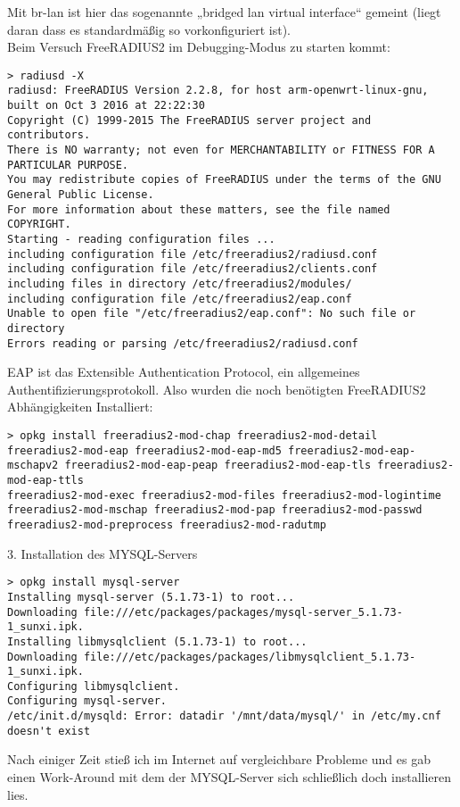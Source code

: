 Mit br-lan ist hier das sogenannte „bridged lan virtual interface“ gemeint (liegt daran dass es
standardmäßig so vorkonfiguriert ist).\\
Beim Versuch FreeRADIUS2 im Debugging-Modus zu starten kommt:\
\begin{lstlisting}
> radiusd -X
radiusd: FreeRADIUS Version 2.2.8, for host arm-openwrt-linux-gnu, built on Oct 3 2016 at 22:22:30
Copyright (C) 1999-2015 The FreeRADIUS server project and contributors.
There is NO warranty; not even for MERCHANTABILITY or FITNESS FOR A PARTICULAR PURPOSE.
You may redistribute copies of FreeRADIUS under the terms of the GNU General Public License.
For more information about these matters, see the file named COPYRIGHT.
Starting - reading configuration files ...
including configuration file /etc/freeradius2/radiusd.conf
including configuration file /etc/freeradius2/clients.conf
including files in directory /etc/freeradius2/modules/
including configuration file /etc/freeradius2/eap.conf
Unable to open file "/etc/freeradius2/eap.conf": No such file or directory
Errors reading or parsing /etc/freeradius2/radiusd.conf
\end{lstlisting}
EAP ist das Extensible Authentication Protocol, ein allgemeines Authentifizierungsprotokoll. Also
wurden die noch benötigten FreeRADIUS2 Abhängigkeiten Installiert:
\begin{lstlisting}
> opkg install freeradius2-mod-chap freeradius2-mod-detail freeradius2-mod-eap freeradius2-mod-eap-md5 freeradius2-mod-eap-mschapv2 freeradius2-mod-eap-peap freeradius2-mod-eap-tls freeradius2-mod-eap-ttls
freeradius2-mod-exec freeradius2-mod-files freeradius2-mod-logintime
freeradius2-mod-mschap freeradius2-mod-pap freeradius2-mod-passwd
freeradius2-mod-preprocess freeradius2-mod-radutmp
\end{lstlisting}
3. Installation des MYSQL-Servers
\begin{lstlisting}
> opkg install mysql-server
Installing mysql-server (5.1.73-1) to root...
Downloading file:///etc/packages/packages/mysql-server_5.1.73-1_sunxi.ipk.
Installing libmysqlclient (5.1.73-1) to root...
Downloading file:///etc/packages/packages/libmysqlclient_5.1.73-1_sunxi.ipk.
Configuring libmysqlclient.
Configuring mysql-server.
/etc/init.d/mysqld: Error: datadir '/mnt/data/mysql/' in /etc/my.cnf
doesn't exist
\end{lstlisting}
Nach einiger Zeit stieß ich im Internet auf vergleichbare Probleme und es gab einen Work-Around
mit dem der MYSQL-Server sich schließlich doch installieren lies.\\
